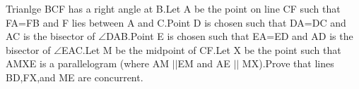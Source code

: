 \item Trianlge BCF has a right angle at B.Let A be the point on line CF such that FA=FB and F lies between A and C.Point D is chosen such that DA=DC and AC is the bisector of $\angle$DAB.Point E is chosen such that EA=ED and AD is the bisector of $\angle$EAC.Let M be the midpoint of CF.Let X be the point such that AMXE is a parallelogram (where AM $||$EM and AE $||$ MX).Prove that lines BD,FX,and ME are concurrent.

